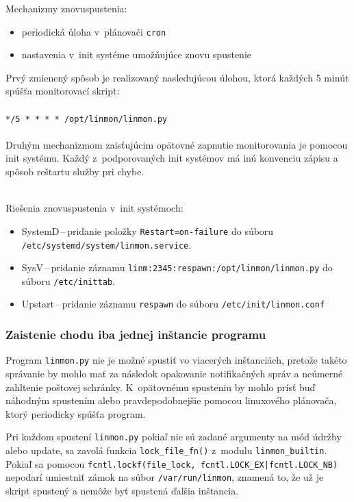 \newpage
\noindent
Mechanizmy znovuspustenia:
\begin{itemize}
	\item periodická úloha v~plánovači \texttt{cron}
	\item nastavenia v~init systéme umožňujúce znovu spustenie
\end{itemize}

\noindent
Prvý zmienený spôsob je realizovaný nasledujúcou úlohou, ktorá každých 5 minút spúšťa monitorovací skript: \\\\ \texttt{*/5 * * * * /opt/linmon/linmon.py}\\\\
Druhým mechanizmom zaisťujúcim opätovné zapnutie monitorovania je pomocou init systému. Každý z~podporovaných init systémov má inú konvenciu zápisu a spôsob reštartu služby pri chybe.

\noindent
\\
Riešenia znovuspustenia v~init systémoch:
\begin{itemize}
	\item SystemD\,--\,pridanie položky \texttt{Restart=on-failure} do súboru\\ \mbox{\texttt{/etc/systemd/\\system/linmon.service}.}
	\item SysV\,--\,pridanie záznamu \texttt{linm:2345:respawn:/opt/linmon/linmon.py} do súboru \texttt{/etc/inittab}.
	\item Upstart\,--\,pridanie záznamu \texttt{respawn} do súboru \texttt{/etc/init/linmon.conf}
\end{itemize}
\subsubsection*{Zaistenie chodu iba jednej inštancie programu}
\label{one_instance}

Program \texttt{linmon.py} nie je možné spustiť vo viacerých inštanciách, pretože takéto správanie by mohlo mať za následok opakovanie notifikačných správ a neúmerné zahltenie poštovej schránky. K~opätovnému spusteniu by mohlo prísť buď náhodným spustením alebo pravdepodobnejšie pomocou linuxového plánovača, ktorý periodicky spúšťa program.

Pri každom spustení \texttt{linmon.py} pokiaľ nie sú zadané argumenty na mód údržby alebo update, sa zavolá funkcia \texttt{lock\_file\_fn()} z~modulu \texttt{linmon\_builtin}. Pokiaľ sa pomocou \texttt{fcntl.lockf(file\_lock, fcntl.LOCK\_EX|fcntl.LOCK\_NB)} nepodarí umiestniť zámok na súbor \texttt{/var/run/linmon}, znamená to, že už je skript spustený a nemôže byť spustená ďalšia inštancia.


